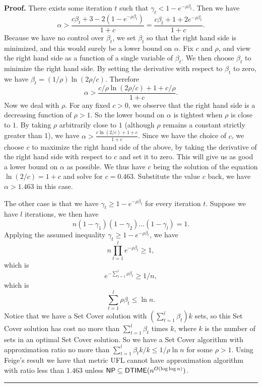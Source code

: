 \documentclass[oneside,final]{ucr}
\newenvironment{proof}[1][Proof]{\textbf{#1.} }{\ \rule{0.5em}{0.5em}}
\begin{document}
\begin{proof}
 There exists some iteration $t$ such that $\gamma_t <
1 - e^{-\rho\beta_t}$. Then we have
\begin{equation*}
  \alpha > \frac{c\beta_t + 3 - 2 (1 - e^{-\rho\beta_t})}{1+c} =
  \frac{c\beta_t + 1 + 2 e^{-\rho\beta_t}}{1+c}.
\end{equation*}
Because we have no control over $\beta_t$, we set $\beta_t$ so that
the right hand side is minimized, and this would surely be a lower
bound on $\alpha$. Fix $c$ and $\rho$, and view the right hand side as
a function of a single variable of $\beta_t$. We then choose $\beta_t$
to minimize the right hand side. By setting the derivative with
respect to $\beta_t$ to zero, we have $\beta_t = (1/\rho)\ln
(2\rho/c)$. Therefore
\begin{equation*}
  \alpha > \frac{c/\rho \ln (2\rho/c) + 1 + c/\rho}{1 +
    c}.
\end{equation*}
Now we deal with $\rho$. For any fixed $c > 0$, we observe that the
right hand side is a decreasing function of $\rho > 1$. So the lower
bound on $\alpha$ is tightest when $\rho$ is close to $1$. By taking
$\rho$ arbitrarily close to $1$ (although $\rho$ remains a constant
strictly greater than 1), we have $\alpha > \frac{c\ln (2/c) + 1 +
  c}{1+c}$. Since we have the choice of $c$, we choose $c$ to maximize
the right hand side of the above, by taking the derivative of the
right hand side with respect to $c$ and set it to zero. This will give
us as good a lower bound on $\alpha$ as possible. We thus have $c$
being the solution of the equation $\ln (2/c) = 1+c$ and solve for
$c=0.463$. Substitute the value $c$ back, we have $\alpha > 1.463$ in
this case.

 The other case is that we have $\gamma_t \geq
1-e^{-\rho\beta_t}$ for every iteration $t$. Suppose we have $l$
iterations, we then have
\begin{equation*}
  n (1-\gamma_1) (1-\gamma_2) \ldots (1-\gamma_l) = 1.
\end{equation*}
Applying the assumed inequality $\gamma_t \geq 1 - e^{-\rho\beta_t}$,
we have
\begin{equation*}
  n \prod_{t=1}^l e^{-\rho\beta_t} \geq 1,
\end{equation*}
which is
\begin{equation*}
  e^{-\sum_{t=1}^l \rho\beta_t} \geq 1/n,
\end{equation*}
which is
\begin{equation*}
  \sum_{t=1}^l \rho\beta_t \leq \ln n.
\end{equation*}
Notice that we have a Set Cover solution with $(\sum_{t=1}^l
\beta_t)k$ sets, so this Set Cover solution has cost no more than
$\sum_{t=1}^l \beta_t$ times $k$, where $k$ is the number of sets in
an optimal Set Cover solution. So we have a Set Cover algorithm with
approximation ratio no more than $\sum_{t=1}^l \beta_t k / k \leq
1/\rho \ln n$ for some $\rho > 1$. Using Feige's result we have that
metric UFL cannot have approximation algorithm with ratio less than
$1.463$ unless ${\mbox{\sf NP}} \subseteq {\mbox{\sf DTIME}}(n^{O(\log\log n)})$.
\end{proof}
\end{document}

